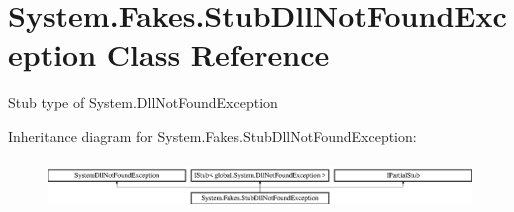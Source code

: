 \hypertarget{class_system_1_1_fakes_1_1_stub_dll_not_found_exception}{\section{System.\-Fakes.\-Stub\-Dll\-Not\-Found\-Exception Class Reference}
\label{class_system_1_1_fakes_1_1_stub_dll_not_found_exception}
}


Stub type of System.\-Dll\-Not\-Found\-Exception 


Inheritance diagram for System.\-Fakes.\-Stub\-Dll\-Not\-Found\-Exception\-:\begin{figure}[H]
\begin{center}
\leavevmode
\includegraphics[height=1.338112cm]{class_system_1_1_fakes_1_1_stub_dll_not_found_exception}
\end{center}
\end{figure}
